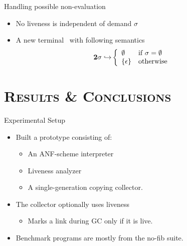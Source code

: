 \documentclass[xcolor=x11names,compress,mathserif]{beamer}
\renewcommand{\(}{\begin{columns}}
\renewcommand{\)}{\end{columns}}
\newcommand{\<}[1]{\begin{column}{#1}}
\renewcommand{\>}{\end{column}}
\begin{document}
\begin{frame} {Handling possible non-evaluation}
  \begin{itemize}
  \item No liveness is independent of demand $\sigma$
  \item A new terminal \clazy\ with following semantics
    \begin{align*}
      {\mathbf{2}}\sigma \hookrightarrow & \left\{ 
      \begin{array}{ll}
        \emptyset&\mbox{if}~\sigma = \emptyset\\
        \{\epsilon\} & \mbox{otherwise}
      \end{array}\right.
    \end{align*}
  \end{itemize}
\end{frame}
\section{\scshape Results \& Conclusions}
\begin{frame}{Experimental Setup}
  \begin{itemize}\itemsep1em
  \item Built a prototype consisting of:
    \begin{itemize}
    \item An ANF-scheme interpreter
    \item Liveness analyzer
    \item A single-generation copying collector.
     \end{itemize}
  \item The collector optionally uses liveness
    \begin{itemize}
    \item Marks a link during GC only if it is live.
    \end{itemize}
  \item Benchmark programs are mostly from the no-fib suite. 
  \end{itemize}

\end{frame}
\end{document}
